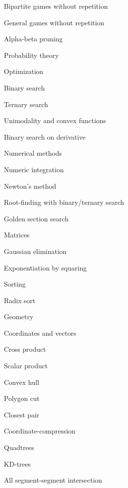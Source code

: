 \begin{myitemize}
\begin{myitemize}
	\item Bipartite games without repetition
	\item General games without repetition
	\item Alpha-beta pruning
\end{myitemize}
\item Probability theory
\begin{myitemize}
\item Optimization
	\item Binary search
	\item Ternary search
	\item Unimodality and convex functions
	\item Binary search on derivative
\end{myitemize}
\item Numerical methods
\begin{myitemize}
	\item Numeric integration
	\item Newton's method
	\item Root-finding with binary/ternary search
	\item Golden section search
\end{myitemize}
\item Matrices
\begin{myitemize}
	\item Gaussian elimination
	\item Exponentiation by squaring
\end{myitemize}
\item Sorting
\begin{myitemize}
	\item Radix sort
\end{myitemize}
\item Geometry
\begin{myitemize}
	\item Coordinates and vectors
	\begin{myitemize}
		\item Cross product
		\item Scalar product
	\end{myitemize}
	\item Convex hull
	\item Polygon cut
	\item Closest pair
	\item Coordinate-compression
	\item Quadtrees
	\item KD-trees
	\item All segment-segment intersection

\end{myitemize}
\end{myitemize}
